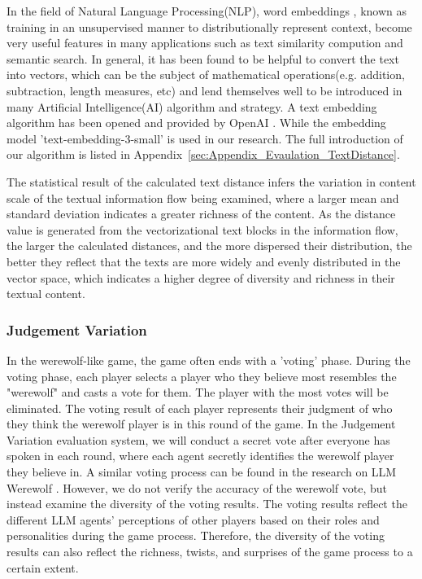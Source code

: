 In the field of Natural Language Processing(NLP), word embeddings \citep{turian2010word,mikolov2013efficient}, known as training in an unsupervised manner to distributionally represent context, become very useful features in many applications such as text similarity compution and semantic search. In general, it has been found to be helpful to convert the text into vectors, which can be the subject of mathematical operations(e.g. addition, subtraction, length measures, etc) and lend themselves well to be introduced in many Artificial Intelligence(AI) algorithm and strategy. A text embedding algorithm has been opened and provided by OpenAI \citep{neelakantan2022text}. While the embedding model 'text-embedding-3-small' is used in our research. The full introduction of our algorithm is listed in Appendix~\ref{sec:Appendix_Evaulation_TextDistance}.

The statistical result of the calculated text distance infers the variation in content scale of the textual information flow being examined, where a larger mean and standard deviation indicates a greater richness of the content. As the distance value is generated from the vectorizational text blocks in the information flow, the larger the calculated distances, and the more dispersed their distribution, the better they reflect that the texts are more widely and evenly distributed in the vector space, which indicates a higher degree of diversity and richness in their textual content. 

\subsubsection{Judgement Variation}

In the werewolf-like game, the game often ends with a 'voting' phase. During the voting phase, each player selects a player who they believe most resembles the "werewolf" and casts a vote for them. The player with the most votes will be eliminated. The voting result of each player represents their judgment of who they think the werewolf player is in this round of the game.
In the Judgement Variation evaluation system, we will conduct a secret vote after everyone has spoken in each round, where each agent secretly identifies the werewolf player they believe in. A similar voting process can be found in the research on LLM Werewolf \citep{jin2024learning,xu2023exploring}. However, we do not verify the accuracy of the werewolf vote, but instead examine the diversity of the voting results. The voting results reflect the different LLM agents' perceptions of other players based on their roles and personalities during the game process. Therefore, the diversity of the voting results can also reflect the richness, twists, and surprises of the game process to a certain extent.

